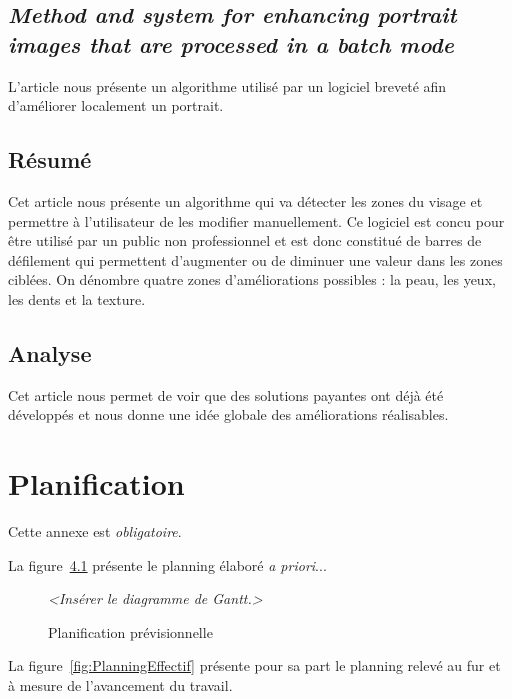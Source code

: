 \documentclass[11pt, french]{report-rd-info}
\begin{document}
\section{\emph{Method and system for enhancing portrait images that are processed in a batch mode}}
L'article \cite{Caner2009} nous présente un algorithme utilisé par un logiciel breveté afin d'améliorer localement un portrait.

\section{Résumé}
Cet article nous présente un algorithme qui va détecter les zones du visage et permettre à l'utilisateur de les modifier manuellement. Ce logiciel est concu pour être utilisé par un public non professionnel et est donc constitué de barres de défilement qui permettent d'augmenter ou de diminuer une valeur dans les zones ciblées. On dénombre quatre zones d'améliorations possibles : la peau, les yeux, les dents et la texture.

\section{Analyse}
Cet article nous permet de voir que des solutions payantes ont déjà été développés et nous donne une idée globale des améliorations réalisables.

\chapter{Planification}

Cette annexe est \emph{obligatoire}.

La figure~\ref{fig:PlanningPrevisionnel} présente le planning élaboré \emph{a priori}...

\begin{figure}
	\centering
		\emph{<Insérer le diagramme de Gantt.>}
	\caption{Planification prévisionnelle}
	\label{fig:PlanningPrevisionnel}
\end{figure}

La figure~\ref{fig:PlanningEffectif} présente pour sa part le planning relevé au fur et à mesure de l'avancement du travail.
\end{document}
